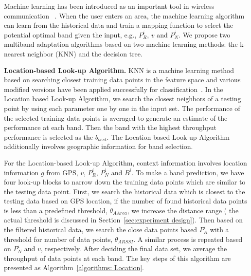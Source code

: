 Machine learning has been introduced as an important tool in wireless communication
~\cite{haykin2005cognitive}. When the user enters an area, the machine
learning algorithm can learn from the historical data and train a mapping 
function to select the potential optimal band given the input, e.g., $P_R^i$, $v$
and $P_N^i$. We propose two multiband adaptation algorithms based on
two machine learning methods: the k-nearest neighbor (KNN) and the decision tree.


{\bf Location-based Look-up Algorithm.} KNN is a machine learning method
based on searching closest training data points in the feature space and various
modified versions have been applied successfully for classification~\cite{zhang2006svm}.
In the Location based Look-up Algorithm, we search the closest neighbors of 
a testing point by using each parameter one by one in the input set. The 
performance of the selected training data points is averaged to generate an estimate of the performance at each band. Then
the band with the highest throughput performance is selected as the $b_{best}$.
The Location based Look-up Algorithm additionally involves geographic information 
for band selection.

For the Location-based Look-up Algorithm, 
context information involves location information $g$ from GPS, $v$, $P_R^i$, $P_N^i$ 
and $B^i$. To make a band prediction, we have four look-up blocks to narrow 
down the training data points which are similar to the testing data point. First,
we search the historical data which is closest to the testing data based on GPS location, 
if the number of found historical data points is less than a predefined threshold, 
 $\theta_{AArea}$, we increase the distance range ( the actual threshold is discussed in 
Section~\ref{sec:experiment design}). Then based on the filtered historical data,
we search the close data points based $P_R^i$ with a threshold for number of data points, 
$\theta_{ARSSI}$. A similar process is repeated based on $P_N^i$ and $v$, respectively.
After deciding the final data set, we average the throughput of data points at each band.
The key steps of this algorithm are presented as Algorithm~\ref{algorithms: Location}.


